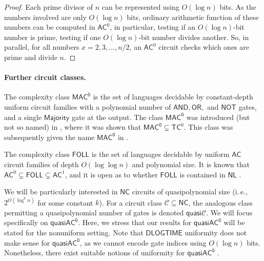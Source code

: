 \documentclass{article}
\newcommand*{\ComplexityClass}[1]{\ensuremath{\mathsf{#1}}\xspace}
\newcommand{\AC}{\ComplexityClass{AC}}
\newcommand{\MACz}{\ComplexityClass{MAC^0}}
\newcommand{\qACz}{\ComplexityClass{quasiAC^0}}
\newcommand{\DLOGTIME}{\ComplexityClass{DLOGTIME}} %
\begin{document}
\begin{proof}
Each prime divisor of $n$ can be represented using $O(\log n)$ bits. As the numbers involved are only $O(\log n)$ bits, ordinary arithmetic function of these numbers can be computed in $\mathsf{AC}^0$, in particular, testing if an $O(\log n)$-bit number is prime, testing if one $O(\log n)$-bit number divides another. So, in parallel, for all numbers $x=2,3,\dotsc,n/2$, an $\mathsf{AC}^0$ circuit checks which ones are prime and divide $n$.
\end{proof}




\paragraph{Further circuit classes.} The complexity class $\MACz$ is the set of languages decidable by constant-depth uniform circuit families with a polynomial number of $\mathsf{AND}, \mathsf{OR},$ and $\mathsf{NOT}$ gates, and a single $\mathsf{Majority}$ gate at the output. The class $\MACz$ was introduced (but not so named) in \cite{VotingPolynomials}, where it was shown that $\MACz \subsetneq \mathsf{TC}^{0}$. This class was subsequently given the name $\MACz$ in \cite{LearnabilityAC0}.

The complexity class $\mathsf{FOLL}$ is the set of languages decidable by uniform $\AC$ circuit families of depth $O(\log \log n)$ and polynomial size. It is known that $\AC^{0} \subsetneq \mathsf{FOLL} \subsetneq \AC^{1}$, and it is open as to whether $\mathsf{FOLL}$ is contained in $\mathsf{NL}$ \cite{BKLM}.

We will be particularly interested in $\mathsf{NC}$ circuits of quasipolynomial size (i.\,e., $2^{O(\log^k n)}$ for some constant $k$). For a circuit class $\mathcal{C} \subseteq \mathsf{NC}$, the analogous class permitting a quasipolynomial number of gates is denoted $\mathsf{quasi}\mathcal{C}$. We will focus specifically on \qACz. Here, we stress that our results for \qACz will be stated for the nonuniform setting. Note that \DLOGTIME uniformity does not make sense for \qACz, as we cannot encode gate indices using $O(\log n)$ bits. Nonetheless, there exist suitable notions of uniformity for $\qACz$ \cite{BarringtonQuasipolynomial,FerrarottiGonzalezScheweTurull}. 
\end{document}
